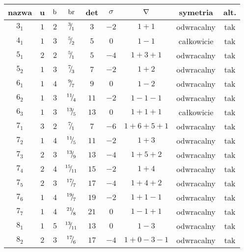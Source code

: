 \renewcommand*{\arraystretch}{1.4}
\footnotesize
\begin{longtable}{ccccccccc}
\hline
nazwa & u & $\operatorname{b}$ & $\operatorname{br}$ & det & $\sigma$ & $\nabla$ & symetria & alt. \\ \hline
\endhead %
$3_{1}$ & $1$ & $2$ & ${}^{3}{\mskip -5mu/\mskip -3mu}_{1}$ & $3$ & $-2$ & $1+1$ & odwracalny & tak \\
$4_{1}$ & $1$ & $3$ & ${}^{5}{\mskip -5mu/\mskip -3mu}_{2}$ & $5$ & $0$ & $1-1$ & całkowicie & tak \\
$5_{1}$ & $2$ & $2$ & ${}^{5}{\mskip -5mu/\mskip -3mu}_{1}$ & $5$ & $-4$ & $1+3+1$ & odwracalny & tak \\
$5_{2}$ & $1$ & $3$ & ${}^{7}{\mskip -5mu/\mskip -3mu}_{3}$ & $7$ & $-2$ & $1+2$ & odwracalny & tak \\
$6_{1}$ & $1$ & $4$ & ${}^{9}{\mskip -5mu/\mskip -3mu}_{7}$ & $9$ & $0$ & $1-2$ & odwracalny & tak \\
$6_{2}$ & $1$ & $3$ & ${}^{11}{\mskip -5mu/\mskip -3mu}_{4}$ & $11$ & $-2$ & $1-1-1$ & odwracalny & tak \\
$6_{3}$ & $1$ & $3$ & ${}^{13}{\mskip -5mu/\mskip -3mu}_{5}$ & $13$ & $0$ & $1+1+1$ & całkowicie & tak \\
$7_{1}$ & $3$ & $2$ & ${}^{7}{\mskip -5mu/\mskip -3mu}_{1}$ & $7$ & $-6$ & $1+6+5+1$ & odwracalny & tak \\
$7_{2}$ & $1$ & $4$ & ${}^{11}{\mskip -5mu/\mskip -3mu}_{5}$ & $11$ & $-2$ & $1+3$ & odwracalny & tak \\
$7_{3}$ & $2$ & $3$ & ${}^{13}{\mskip -5mu/\mskip -3mu}_{9}$ & $13$ & $-4$ & $1+5+2$ & odwracalny & tak \\
$7_{4}$ & $2$ & $4$ & ${}^{15}{\mskip -5mu/\mskip -3mu}_{11}$ & $15$ & $-2$ & $1+4$ & odwracalny & tak \\
$7_{5}$ & $2$ & $3$ & ${}^{17}{\mskip -5mu/\mskip -3mu}_{7}$ & $17$ & $-4$ & $1+4+2$ & odwracalny & tak \\
$7_{6}$ & $1$ & $4$ & ${}^{19}{\mskip -5mu/\mskip -3mu}_{7}$ & $19$ & $-2$ & $1+1-1$ & odwracalny & tak \\
$7_{7}$ & $1$ & $4$ & ${}^{21}{\mskip -5mu/\mskip -3mu}_{8}$ & $21$ & $0$ & $1-1+1$ & odwracalny & tak \\
$8_{1}$ & $1$ & $5$ & ${}^{13}{\mskip -5mu/\mskip -3mu}_{11}$ & $13$ & $0$ & $1-3$ & odwracalny & tak \\
$8_{2}$ & $2$ & $3$ & ${}^{17}{\mskip -5mu/\mskip -3mu}_{6}$ & $17$ & $-4$ & $1+0-3-1$ & odwracalny & tak \\

\end{longtable}
